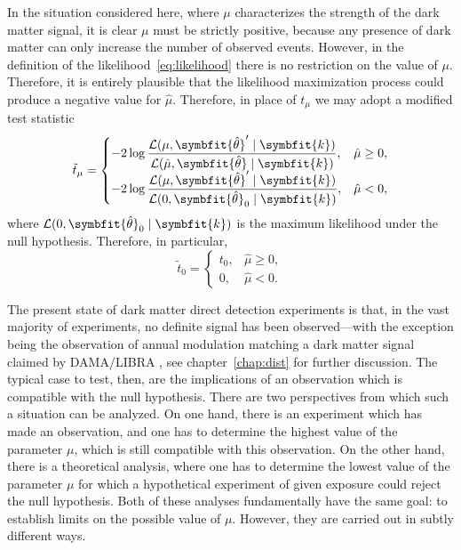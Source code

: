 \documentclass[b5paper, 10pt, twoside]{book}
\renewcommand{\vec}[1]{\symbfit{#1}}
\newcommand{\unitv}[1]{\symbfit{\hat{#1}}}
\begin{document}
In the situation considered here, where $\mu$ characterizes the strength of the dark matter signal, it is clear $\mu$ must be strictly positive, because any presence of dark matter can only increase the number of observed events. However, in the definition of the likelihood~\eqref{eq:likelihood} there is no restriction on the value of $\mu$. Therefore, it is entirely plausible that the likelihood maximization process could produce a negative value for $\hat{\mu}$. Therefore, in place of $t_\mu$ we may adopt a modified test statistic \parencite{BaxterEtAl2021}
\begin{equation}
    \tilde{t}_\mu=
    \begin{cases}
        \displaystyle-2\log\frac{\mathcal{L}(\mu,\unitv{\theta}'\mid\vec{k})}{\mathcal{L}(\hat{\mu},\unitv{\theta}\mid\vec{k})},&\hat{\mu}\geq0,\\
        \displaystyle-2\log\frac{\mathcal{L}(\mu,\unitv{\theta}'\mid\vec{k})}{\mathcal{L}(0,\unitv{\theta}_0\mid\vec{k})},&\hat{\mu}<0,
    \end{cases}
\end{equation}
where $\mathcal{L}(0,\unitv{\theta}_0\mid\vec{k})$ is the maximum likelihood under the null hypothesis. Therefore, in particular,
\begin{equation}
    \tilde{t}_0=
    \begin{cases}
        t_0,&\hat{\mu}\geq0,\\
        0,&\hat{\mu}<0.
    \end{cases}
\end{equation}

The present state of dark matter direct detection experiments is that, in the vast majority of experiments, no definite signal has been observed---with the exception being the observation of annual modulation matching a dark matter signal claimed by DAMA/LIBRA \parencite{BernabeiEtAl2023}, see chapter~\ref{chap:dist} for further discussion. The typical case to test, then, are the implications of an observation which is compatible with the null hypothesis. There are two perspectives from which such a situation can be analyzed. On one hand, there is an experiment which has made an observation, and one has to determine the highest value of the parameter $\mu$, which is still compatible with this observation. On the other hand, there is a theoretical analysis, where one has to determine the lowest value of the parameter $\mu$ for which a hypothetical experiment of given exposure could reject the null hypothesis. Both of these analyses fundamentally have the same goal: to establish limits on the possible value of $\mu$. However, they are carried out in subtly different ways.
\end{document}
